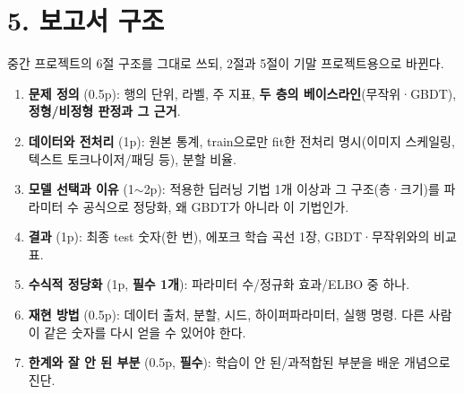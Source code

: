 \documentclass[12pt]{article}
\begin{document}
\section*{5. 보고서 구조}
중간 프로젝트의 6절 구조를 그대로 쓰되, 2절과 5절이 기말 프로젝트용으로
바뀐다.
\begin{enumerate}
\item \textbf{문제 정의} (0.5p): 행의 단위, 라벨, 주 지표,
  \textbf{두 층의 베이스라인}(무작위·GBDT), \textbf{정형/비정형
  판정과 그 근거}.
\item \textbf{데이터와 전처리} (1p): 원본 통계, train으로만 fit한
  전처리 명시(이미지 스케일링, 텍스트 토크나이저/패딩 등), 분할
  비율.
\item \textbf{모델 선택과 이유} (1$\sim$2p): 적용한 딥러닝 기법
  1개 이상과 그 구조(층·크기)를 파라미터 수 공식으로 정당화, 왜
  GBDT가 아니라 이 기법인가.
\item \textbf{결과} (1p): 최종 test 숫자(한 번), 에포크 학습 곡선
  1장, GBDT·무작위와의 비교표.
\item \textbf{수식적 정당화} (1p, \textbf{필수 1개}): 파라미터
  수/정규화 효과/ELBO 중 하나.
\item \textbf{재현 방법} (0.5p): 데이터 출처, 분할, 시드, 하이퍼파라미터, 실행 명령. 다른 사람이 같은 숫자를 다시 얻을 수 있어야 한다.
\item \textbf{한계와 잘 안 된 부분} (0.5p, \textbf{필수}):
  학습이 안 된/과적합된 부분을 배운 개념으로 진단.
\end{enumerate}
\end{document}
